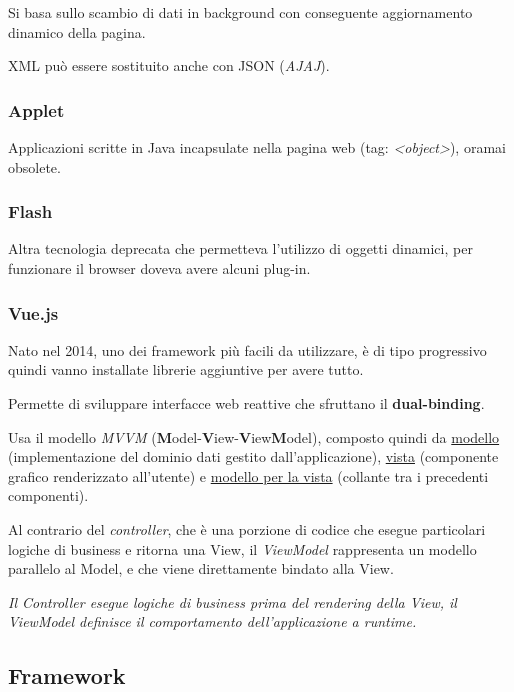 Si basa sullo scambio di dati in background con conseguente
aggiornamento dinamico della pagina.

XML può essere sostituito anche con JSON (\emph{AJAJ}).

\subsubsection{Applet}\label{applet}

Applicazioni scritte in Java incapsulate nella pagina web (tag:
\emph{\textless object\textgreater{}}), oramai obsolete.

\subsubsection{Flash}\label{flash}

Altra tecnologia deprecata che permetteva l'utilizzo di oggetti
dinamici, per funzionare il browser doveva avere alcuni plug-in.

\subsubsection{Vue.js}\label{vue.js}

Nato nel 2014, uno dei framework più facili da utilizzare, è di tipo
progressivo quindi vanno installate librerie aggiuntive per avere tutto.

Permette di sviluppare interfacce web reattive che sfruttano il
\textbf{dual-binding}.

Usa il modello \emph{MVVM}
(\textbf{M}odel-\textbf{V}iew-\textbf{V}iew\textbf{M}odel), composto
quindi da \ul{modello} (implementazione del dominio dati gestito
dall'applicazione), \ul{vista} (componente grafico renderizzato
all'utente) e \ul{modello per la vista} (collante tra i precedenti
componenti).

Al contrario del \emph{controller}, che è una porzione di codice che
esegue particolari logiche di business e ritorna una View, il
\emph{ViewModel} rappresenta un modello parallelo al Model, e che viene
direttamente bindato alla View.

\emph{Il Controller esegue logiche di business prima del rendering della
View, il ViewModel definisce il comportamento dell'applicazione a
runtime.}

\subsection{Framework}\label{framework}

